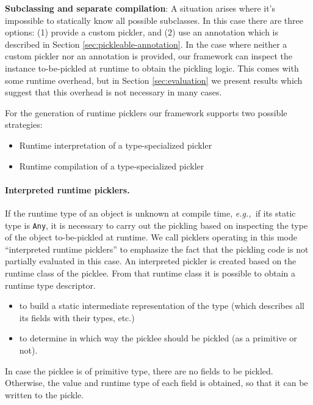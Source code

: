 \documentclass[10pt]{sigplanconf}
\theoremstyle{definition}
\theoremstyle{definition}
\newcommand{\todo}{{\bf \colorbox{red}{\color{white}TODO:}}}
\newcommand{\eg}{{\em e.g.,~}}
\newcommand{\term}[1]{\mbox{\texttt{#1}}}
\begin{document}
{\bf Subclassing and separate compilation}: A situation arises where it's
impossible to statically know all possible subclasses. In this case there are
three options: (1) provide a custom pickler, and (2) use an annotation which
is described in Section \ref{sec:pickleable-annotation}. In the case where
neither a custom pickler nor an annotation is provided, our framework can
inspect the instance to-be-pickled at runtime to obtain the pickling logic.
This comes with some runtime overhead, but in Section \ref{sec:evaluation} we
present results which suggest that this overhead is not necessary in many
cases.

For the generation of runtime picklers our framework supports two possible
strategies:

\begin{itemize}
\item Runtime interpretation of a type-specialized pickler
\item Runtime compilation of a type-specialized pickler
\end{itemize}

\paragraph{Interpreted runtime picklers.} If the runtime type of an object is
unknown at compile time, \eg if its static type is \term{Any}, it is
necessary to carry out the pickling based on inspecting the type of the object
to-be-pickled at runtime. We call picklers operating in this mode ``interpreted
runtime picklers'' to emphasize the fact that the pickling code is not
partially evaluated in this case. An interpreted pickler is created based on
the runtime class of the picklee. From that runtime class it is possible to
obtain a runtime type descriptor.

\begin{itemize}
\item to build a static intermediate representation of the type (which describes all its fields with their types, etc.)
\item to determine in which way the picklee should be pickled (as a primitive or not).
\end{itemize}

In case the picklee is of primitive type, there are no fields to be pickled.
Otherwise, the value and runtime type of each field is obtained, so that it
can be written to the pickle.

\end{document}
